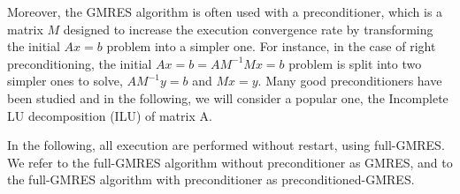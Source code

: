     
      
        

Moreover, the GMRES algorithm is often used with a preconditioner, which is a matrix $M$ designed to increase the execution convergence rate by transforming the initial $A x = b$ problem into a simpler one. For instance, in the case of right preconditioning, the initial $A x = b = A M^{-1} M x = b$ problem is split into two simpler ones to solve, $A M^{-1} y = b$ and $M x = y$. Many good preconditioners have been studied and in the following, we will consider a popular one, the Incomplete LU decomposition (ILU) of matrix A. 

In the following, all execution are performed without restart, using full-GMRES. We refer to the full-GMRES algorithm without preconditioner as GMRES, and to the full-GMRES algorithm with preconditioner as preconditioned-GMRES.


